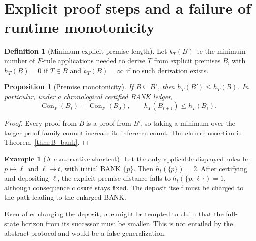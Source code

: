 \documentclass[11pt,letterpaper]{article}
\newtheorem{proposition}[theorem]{Proposition}
\theoremstyle{definition}
\newtheorem{definition}[theorem]{Definition}
\newtheorem{example}[theorem]{Example}
\theoremstyle{remark}
\newcommand{\Con}{\operatorname{Con}_{F}}
\begin{document}
\section{Explicit proof steps and a failure of runtime monotonicity}
\begin{definition}[Minimum explicit-premise length]
Let $h_T(B)$ be the minimum number of $F$-rule applications needed to derive $T$ from explicit premises $B$, with $h_T(B)=0$ if $T\in B$ and $h_T(B)=\infty$ if no such derivation exists.
\end{definition}
\begin{proposition}[Premise monotonicity]\label{prop:B_mono}
If $B\subseteq B'$, then $h_T(B')\le h_T(B)$. In particular, under a chronological certified BANK ledger,
\[
 \Con(B_i)=\Con(B_0),\qquad h_T(B_{i+1})\le h_T(B_i).
\]
\end{proposition}
\begin{proof}
Every proof from $B$ is a proof from $B'$, so taking a minimum over the larger proof family cannot increase its inference count. The closure assertion is Theorem~\ref{thm:B_bank}.
\end{proof}

\begin{example}[A conservative shortcut]
Let the only applicable displayed rules be $p\mapsto\ell$ and $\ell\mapsto t$, with initial BANK $\{p\}$. Then $h_t(\{p\})=2$. After certifying and depositing $\ell$, the explicit-premise distance falls to $h_t(\{p,\ell\})=1$, although consequence closure stays fixed. The deposit itself must be charged to the path leading to the enlarged BANK.
\end{example}

Even after charging the deposit, one might be tempted to claim that the full-state horizon from its successor must be smaller. This is not entailed by the abstract protocol and would be a false generalization.
\end{document}
